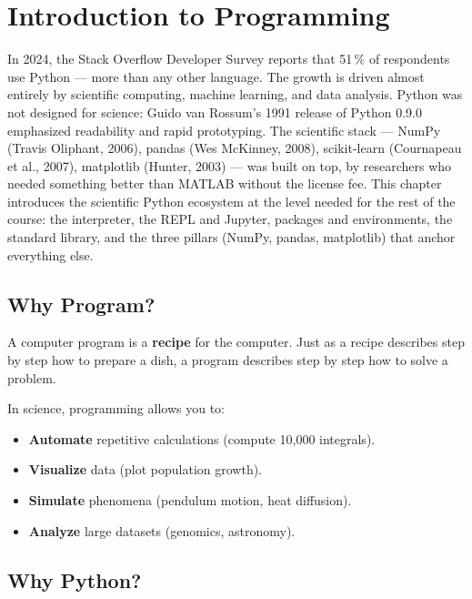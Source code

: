 \chapter{Introduction to Programming}
\label{ch:intro}

In 2024, the Stack Overflow Developer Survey reports that 51\,\% of respondents use Python --- more than any other language. The growth is driven almost entirely by scientific computing, machine learning, and data analysis. Python was not designed for science: Guido van Rossum's 1991 release of Python 0.9.0 emphasized readability and rapid prototyping. The scientific stack --- NumPy (Travis Oliphant, 2006), pandas (Wes McKinney, 2008), scikit-learn (Cournapeau et al., 2007), matplotlib (Hunter, 2003) --- was built on top, by researchers who needed something better than MATLAB without the license fee. This chapter introduces the scientific Python ecosystem at the level needed for the rest of the course: the interpreter, the REPL and Jupyter, packages and environments, the standard library, and the three pillars (NumPy, pandas, matplotlib) that anchor everything else.

\section{Why Program?}

\begin{intuition}
A computer program is a \textbf{recipe} for the computer. Just as a recipe describes step by step how to prepare a dish, a program describes step by step how to solve a problem.
\end{intuition}

In science, programming allows you to:
\begin{itemize}
\item \textbf{Automate} repetitive calculations (compute 10,000 integrals).
\item \textbf{Visualize} data (plot population growth).
\item \textbf{Simulate} phenomena (pendulum motion, heat diffusion).
\item \textbf{Analyze} large datasets (genomics, astronomy).
\end{itemize}

\section{Why Python?}


